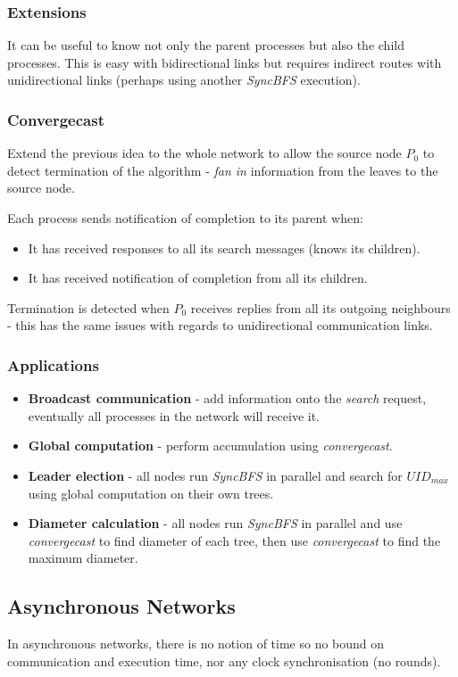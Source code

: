 \documentclass[11pt]{article}
\begin{document}
\subsubsection{Extensions}
It can be useful to know not only the parent processes but also the child processes.
This is easy with bidirectional links but requires indirect routes with unidirectional links (perhaps using another \textit{SyncBFS} execution).

\subsubsection{Convergecast}
Extend the previous idea to the whole network to allow the source node $P_0$ to detect termination of the algorithm - \textit{fan in} information from the leaves to the source node.

Each process sends notification of completion to its parent when:
\begin{itemize}
  \item It has received responses to all its search messages (knows its children).
  \item It has received notification of completion from all its children.
\end{itemize}

Termination is detected when $P_0$ receives replies from all its outgoing neighbours - this has the same issues with regards to unidirectional communication links.

\subsubsection{Applications}
\begin{itemize}
  \item \textbf{Broadcast communication} - add information onto the \textit{search} request, eventually all processes in the network will receive it.
  \item \textbf{Global computation} - perform accumulation using \textit{convergecast}.
  \item \textbf{Leader election} - all nodes run \textit{SyncBFS} in parallel and search for $UID_{max}$ using global computation on their own trees.
  \item \textbf{Diameter calculation} - all nodes run \textit{SyncBFS} in parallel and use  \textit{convergecast} to find diameter of each tree, then use \textit{convergecast} to find the maximum diameter.
\end{itemize}

\subsection{Asynchronous Networks}
In asynchronous networks, there is no notion of time so no bound on communication and execution time, nor any clock synchronisation (no rounds).
\end{document}
